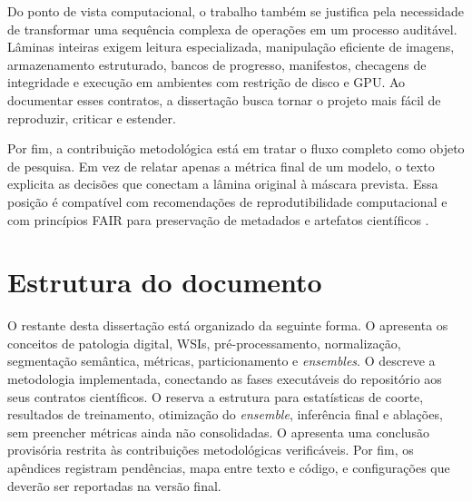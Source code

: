 Do ponto de vista computacional, o trabalho também se justifica pela necessidade
de transformar uma sequência complexa de operações em um processo auditável.
Lâminas inteiras exigem leitura especializada, manipulação eficiente de imagens,
armazenamento estruturado, bancos de progresso, manifestos, checagens de
integridade e execução em ambientes com restrição de disco e GPU. Ao documentar
esses contratos, a dissertação busca tornar o projeto mais fácil de reproduzir,
criticar e estender.

Por fim, a contribuição metodológica está em tratar o fluxo completo como objeto
de pesquisa. Em vez de relatar apenas a métrica final de um modelo, o texto
explicita as decisões que conectam a lâmina original à máscara prevista. Essa
posição é compatível com recomendações de reprodutibilidade computacional e com
princípios FAIR para preservação de metadados e artefatos científicos
\cite{wilkinson2016fair,piccolo2016tools}.

\section{Estrutura do documento}\label{sec:estrutura_documento}

O restante desta dissertação está organizado da seguinte forma. O
 apresenta os conceitos de patologia digital,
WSIs, pré-processamento, normalização, segmentação semântica, métricas,
particionamento e \textit{ensembles}. O 
descreve a metodologia implementada, conectando as fases executáveis do
repositório aos seus contratos científicos. O 
reserva a estrutura para estatísticas de coorte, resultados de treinamento,
otimização do \textit{ensemble}, inferência final e ablações, sem preencher
métricas ainda não consolidadas. O  apresenta uma
conclusão provisória restrita às contribuições metodológicas verificáveis. Por
fim, os apêndices registram pendências, mapa entre texto e código, e
configurações que deverão ser reportadas na versão final.
